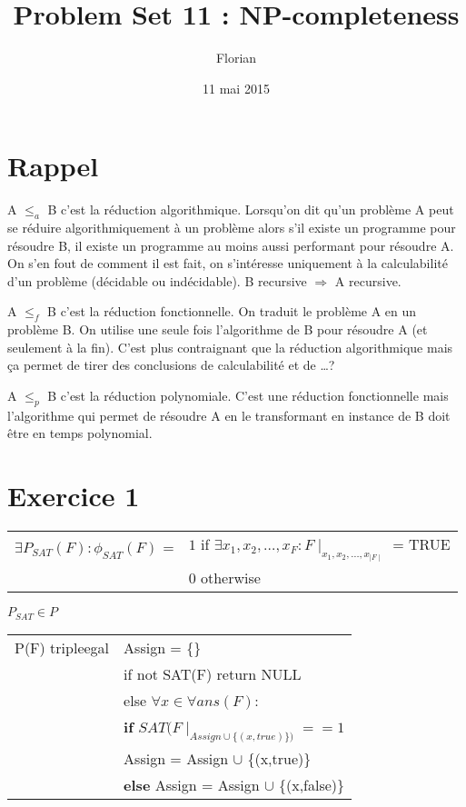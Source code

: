 \documentclass[a4paper, 12pt]{article}
\author{Florian \bsc{Thuin}}
\title{Problem Set 11 : NP-completeness}
\date{11 mai 2015}
\begin{document}
\maketitle

\tableofcontents

\section*{Rappel}

A $\leq_{a}$ B c'est la réduction algorithmique. Lorsqu'on dit qu'un
problème A peut se réduire algorithmiquement à un problème alors s'il
existe un programme pour résoudre B, il existe un programme au moins
aussi performant pour résoudre A. On s'en fout de comment il est fait,
on s'intéresse uniquement à la calculabilité d'un problème (décidable ou
indécidable). B recursive $\Rightarrow$ A recursive.

A $\leq_{f}$ B c'est la réduction fonctionnelle. On traduit le problème
A en un problème B. On utilise une seule fois l'algorithme de B pour
résoudre A (et seulement à la fin). C'est plus contraignant que la
réduction algorithmique mais ça permet de tirer des conclusions de
calculabilité et de \dots ?

A $\leq_{p}$ B c'est la réduction polynomiale. C'est une réduction
fonctionnelle mais l'algorithme qui permet de résoudre A en le
transformant en instance de B doit être en temps polynomial.

\section{Exercice 1}

\begin{tabular}{ll}
    $\exists P_{SAT}(F) : \phi_{SAT} (F)$ = & $1$ if $\exists x_{1}, x_{2},\dots, x_{F} : F \mid_{x_{1}, x_{2},\dots, x_{\mid F\mid}}$ = TRUE \\
    & 0 otherwise
\end{tabular}

$P_{SAT} \in P$ 

\begin{tabular}{ll}
    P(F) tripleegal & Assign = \{\} \\
    & if not SAT(F) return NULL\\
    & else $\forall x \in \forall ans(F) :$\\
    & \textbf{if} $SAT(F \mid_{Assign \cup \{(x, true)\})} == 1$ \\
    & Assign = Assign $\cup$ \{(x,true)\} \\
    & \textbf{else} Assign = Assign $\cup$ \{(x,false)\}
\end{tabular}
\end{document}
